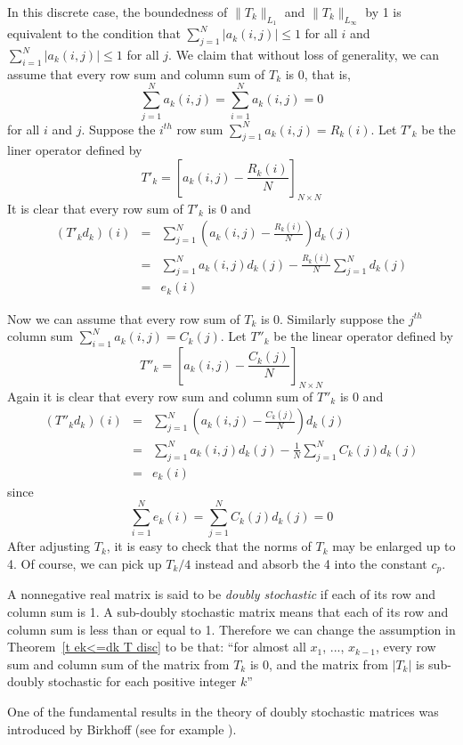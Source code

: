 \documentclass[12pt]{amsart}
\begin{document}
In this discrete case, the boundedness of
$\|T_k\|_{L_1}$ and $\|T_k\|_{L_\infty }$ by 1 is equivalent to
the condition that $\sum_{j=1}^N |a_k(i,j)|\leq 1 $ for all $i$
and $\sum_{i=1}^N |a_k(i,j)|\leq 1$ for all $j$. We claim that
without loss of generality, we can assume that every row sum and
column sum of $T_k$ is 0, that is,
\[ \sum_{j=1}^N a_k(i,j)= \sum_{i=1}^N a_k(i,j)=0\]
for all $i$ and $j$. 
Suppose the $i^{th}$ row sum $\sum_{j=1}^N
a_k(i,j)=R_k(i)$. Let $T'_k$ be the liner operator defined by
\[T'_k=\left[a_k(i,j)-\frac{R_k(i)}{N} \right]_{N\times N}\]
It is clear that every row sum of $T'_k$ is 0 and
\begin{eqnarray*}
(T'_kd_k)(i)&=& \sum_{j=1}^N \left(a_k(i,j)-\frac{R_k(i)}{N} \right)d_k(j)\\
            &=& \sum_{j=1}^N a_k(i,j)d_k(j)-\frac{R_k(i)}{N} \sum_{j=1}^N d_k(j)\\
            &=& e_k(i)
\end{eqnarray*}

Now we can assume that every row sum of $T_k$ is 0. Similarly
suppose the $j^{th}$ column sum $\sum_{i=1}^N a_k(i,j)=C_k(j)$.
Let $T''_k$ be the linear operator defined by
\[T''_k=\left[a_k(i,j)-\frac{C_k(j)}{N} \right]_{N\times N}\]
Again it is clear that every row sum and column sum of $T''_k$ is
0 and
\begin{eqnarray*}
(T''_kd_k)(i)&=& \sum_{j=1}^N \left(a_k(i,j)-\frac{C_k(j)}{N} \right)d_k(j)\\
            &=& \sum_{j=1}^N a_k(i,j)d_k(j)-\frac{1}{N} \sum_{j=1}^N C_k(j)d_k(j)\\
            &=& e_k(i)
\end{eqnarray*}
since
\[\sum_{i=1}^N e_k(i)= \sum_{j=1}^N C_k(j)d_k(j)=0\]
After adjusting $T_k$, it is easy to check that the norms of $T_k$
may be enlarged up to 4. Of course, we can pick up $T_k /4 $
instead and absorb the 4 into the constant $c_p$.

A nonnegative real matrix is said to be \emph{doubly stochastic} if each
of its row and column sum is 1. A sub-doubly stochastic matrix
means that each of its row and column sum is less than or equal to
1. Therefore we can change the assumption in Theorem~\ref{t ek<=dk T disc} 
to be that:
``for almost all $x_1$, ..., $x_{k-1}$, every row sum and
column sum of the matrix from $T_k$ is 0, 
and the matrix from $|T_k|$ is sub-doubly stochastic for each positive
integer $k$''

 One of the fundamental results in the theory of doubly
stochastic matrices was introduced by Birkhoff (see for example
\cite[p.~117]{M1}).
\end{document}
